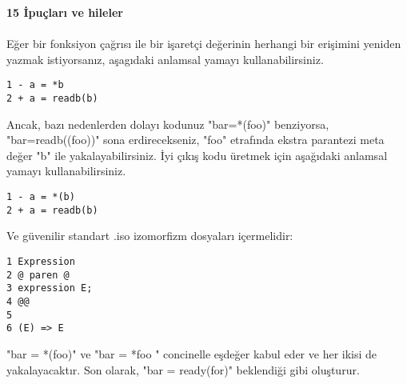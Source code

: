 \documentclass[22pt]{article}
\begin{document}
\textbf{15 İpuçları ve hileler}\\
\\
Eğer bir fonksiyon çağrısı ile bir işaretçi değerinin herhangi bir erişimini yeniden yazmak istiyorsanız, aşagıdaki anlamsal yamayı kullanabilirsiniz.
\begin{lstlisting}
1 - a = *b
2 + a = readb(b)
\end{lstlisting}
Ancak, bazı nedenlerden dolayı kodunuz "bar=*(foo)" benziyorsa,  "bar=readb((foo))" sona erdirecekseniz, "foo" etrafında ekstra parantezi meta değer "b" ile yakalayabilirsiniz. İyi çıkış kodu üretmek için aşağıdaki anlamsal yamayı kullanabilirsiniz.
\begin{lstlisting}
1 - a = *(b)
2 + a = readb(b)
\end{lstlisting}
Ve güvenilir standart .iso izomorfizm dosyaları içermelidir:
\begin{lstlisting}
1 Expression
2 @ paren @
3 expression E;
4 @@
5
6 (E) => E
\end{lstlisting}
"bar = *(foo)" ve "bar = *foo "  concinelle eşdeğer kabul eder ve her ikisi de yakalayacaktır. Son olarak, "bar = ready(for)" beklendiği gibi oluşturur.
\end{document}
